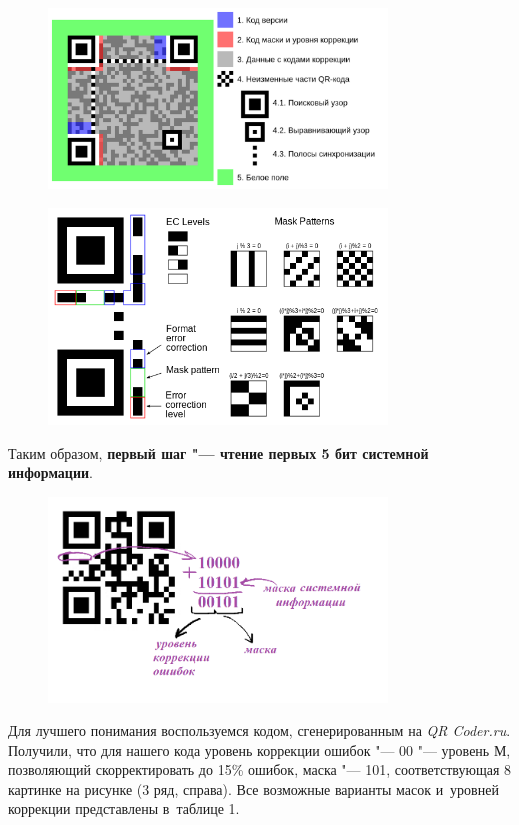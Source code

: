 \documentclass[final,pdftex]{../../template/epsilonj}
\begin{document}
\begin{figure}
	\noindent 
	\begin{minipage}[c]{90mm} 
		\includegraphics[width=90mm]{qr1.png} 
		\label{figLeft}
	\end{minipage}
	\hfill 
	\begin{minipage}[c]{90mm} 
		\includegraphics[width=90mm]{qr2.png}
		\label{figRight}
	\end{minipage}
\end{figure}

Таким образом, {\bf первый шаг "--- чтение первых 5 бит системной информации}.
\begin{figure}[htbp]
	\noindent
	\hfil
	\includegraphics[width=90mm]{1.png}
	\hfil
\end{figure}

Для лучшего понимания воспользуемся кодом, сгенерированным на {\it QR Coder.ru}. Получили, что для нашего кода уровень коррекции ошибок "--- 00 "--- уровень М, позволяющий скорректировать до 15\% ошибок, маска "--- 101, соответствующая 8 картинке на рисунке (3 ряд, справа). Все возможные варианты масок и~уровней коррекции представлены в~таблице 1.
\end{document}
